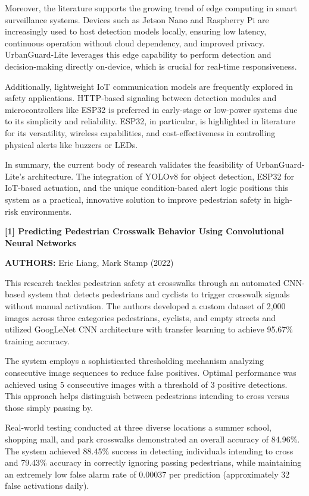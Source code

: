 \documentclass[a4paper, 12pt]{report}
\begin{document}
Moreover, the literature supports the growing trend of edge computing in smart surveillance systems. Devices such as Jetson Nano and Raspberry Pi are increasingly used to host detection models locally, ensuring low latency, continuous operation without cloud dependency, and improved privacy. UrbanGuard-Lite leverages this edge capability to perform detection and decision-making directly on-device, which is crucial for real-time responsiveness.

Additionally, lightweight IoT communication models are frequently explored in safety applications. HTTP-based signaling between detection modules and microcontrollers like ESP32 is preferred in early-stage or low-power systems due to its simplicity and reliability. ESP32, in particular, is highlighted in literature for its versatility, wireless capabilities, and cost-effectiveness in controlling physical alerts like buzzers or LEDs.

In summary, the current body of research validates the feasibility of UrbanGuard-Lite’s architecture. The integration of YOLOv8 for object detection, ESP32 for IoT-based actuation, and the unique condition-based alert logic positions this system as a practical, innovative solution to improve pedestrian safety in high-risk environments.

\noindent \textbf{[1] Predicting Pedestrian Crosswalk Behavior Using Convolutional Neural Networks}

\textbf{AUTHORS:} Eric Liang, Mark Stamp (2022)


This research tackles pedestrian safety at crosswalks through an automated CNN-based system that detects pedestrians and cyclists to trigger crosswalk signals without manual activation. The authors developed a custom dataset of 2,000 images across three categories pedestrians, cyclists, and empty streets and utilized GoogLeNet CNN architecture with transfer learning to achieve 95.67\% training accuracy.

The system employs a sophisticated thresholding mechanism analyzing consecutive image sequences to reduce false positives. Optimal performance was achieved using 5 consecutive images with a threshold of 3 positive detections. This approach helps distinguish between pedestrians intending to cross versus those simply passing by.

Real-world testing conducted at three diverse locations a summer school, shopping mall, and park crosswalks demonstrated an overall accuracy of 84.96\%. The system achieved 88.45\% success in detecting individuals intending to cross and 79.43\% accuracy in correctly ignoring passing pedestrians, while maintaining an extremely low false alarm rate of 0.00037 per prediction (approximately 32 false activations daily).
\end{document}
